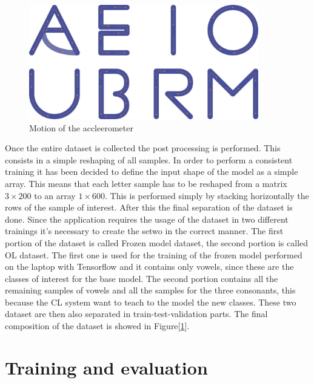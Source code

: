 \documentclass[12pt]{report}
\begin{document}
\begin{figure}[h!]
    \centering
    \includegraphics[width=100mm]{Figures/Chapter4/letters_motion.jpg} 
    \caption{Motion of the accleerometer}
    \label{fig:letters_motion}    
\end{figure}

Once the entire dataset is collected the post processing is performed. This consists in a simple reshaping of all samples. In order to perform a consistent training it has been decided to define the input shape of the model as a simple array. This means that each letter sample has to be reshaped from a matrix  $3 \times 200$ to an array $1 \times 600$. This is performed simply by stacking horizontally the rows of the sample of interest. After this the final separation of the dataset is done. Since the application requires the usage of the dataset in two different trainings it's necessary to create the setwo in the correct manner. The first portion of the dataset is called Frozen model dataset, the second portion is called OL dataset. The first one is used for the training of the frozen model performed on the laptop with Tensorflow and it contains only vowels, since these are the classes of interest for the base model. The second portion contains all the remaining samples of vowels and all the samples for the three consonants, this because the CL system want to teach to the model the new classes. These two dataset are then also separated in train-test-validation parts. The final composition of the dataset is showed in Figure[\ref{}].


\section{Training and evaluation}
\end{document}

